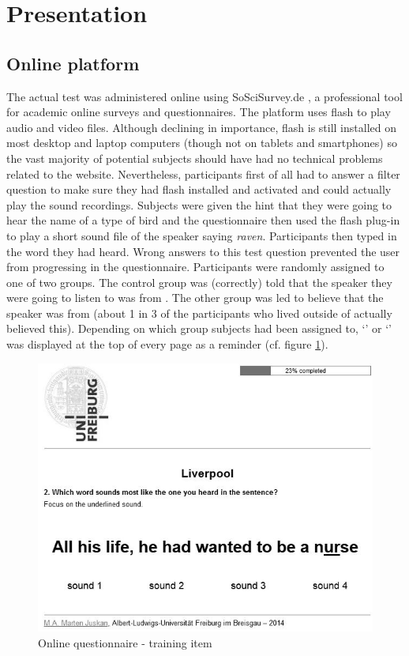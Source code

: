 \section{Presentation}
\label{sec.perc_method.pres}

\subsection{Online platform}
\label{sec.perc_method.pres.platform}

The actual test was administered online using SoSciSurvey.de \parencite{sosci}, a professional tool for academic online surveys and questionnaires.
The platform uses flash to play audio and video files.
Although declining in importance, flash is still installed on most desktop and laptop computers (though not on tablets and smartphones) so the vast majority of potential subjects should have had no technical problems related to the website.
Nevertheless, participants first of all had to answer a filter question to make sure they had flash installed and activated and could actually play the sound recordings.
Subjects were given the hint that they were going to hear the name of a type of bird and the questionnaire then used the flash plug-in to play a short sound file of the speaker saying \emph{raven}.
Participants then typed in the word they had heard.
Wrong answers to this test question prevented the user from progressing in the questionnaire.
Participants were randomly assigned to one of two groups.
The control group was (correctly) told that the speaker they were going to listen to was from .
The other group was led to believe that the speaker was from  (about 1 in 3 of the participants who lived outside of  actually believed this).
Depending on which group subjects had been assigned to, `' or `' was displayed at the top of every page as a reminder (cf. figure \ref{fig.online.screenshot}).

\begin{figure}[h]
	\includegraphics[width=\textwidth]{./figures/questionnaire_screenshot}
	\caption{Online questionnaire - training item}
	\label{fig.online.screenshot}
\end{figure}

